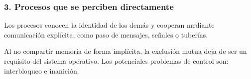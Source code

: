 \subsubsection{3. Procesos que se perciben directamente}

Los procesos conocen la identidad de los demás y cooperan mediante comunicación explícita, como paso de mensajes, señales o tuberías.

Al no compartir memoria de forma implícita, la exclusión mutua deja de ser un requisito del sistema operativo. Los potenciales problemas de control son: interbloqueo e inanición.
















